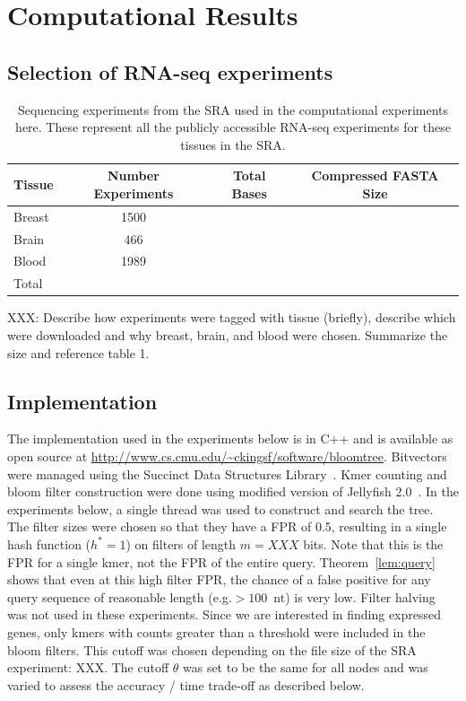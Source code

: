 \documentclass[11pt]{article}
\begin{document}

\section{Computational Results}

\subsection{Selection of RNA-seq experiments}

\begin{table}
\centering
\begin{tabular}{lccc}
\toprule
Tissue & Number Experiments & Total Bases & Compressed FASTA Size \\
\midrule
Breast & 1500 \\
Brain & 466 & \\
Blood & 1989 \\
\midrule
Total & \\
\bottomrule
\end{tabular}
\caption{Sequencing experiments from the SRA used in the computational experiments here. These represent all the publicly accessible RNA-seq experiments for these tissues in the SRA.}
\end{table}

XXX: Describe how experiments were tagged with tissue (briefly), describe which were downloaded and why breast, brain, and blood were chosen. Summarize the size and reference table 1.

\subsection{Implementation}

The implementation used in the experiments below is in C++ and is available as open source at \url{http://www.cs.cmu.edu/~ckingsf/software/bloomtree}. Bitvectors were managed using the Succinct Data Structures Library~\cite{sdsl}. Kmer counting and bloom filter construction were done using modified version of Jellyfish 2.0~\cite{jellyfish}. In the experiments below, a single thread was used to construct and search the tree. The filter sizes were chosen so that they have a FPR of $0.5$, resulting in a single hash function ($h^* = 1$) on filters of length $m=XXX$ bits. Note that this is the FPR for a single kmer, not the FPR of the entire query. Theorem~\ref{lem:query} shows that even at this high filter FPR, the chance of a false positive for any query sequence of reasonable length (e.g.\@ $> 100$~nt) is very low. Filter halving was not used in these experiments. Since we are interested in finding expressed genes, only kmers with counts greater than a threshold were included in the bloom filters. This cutoff was chosen depending on the file size of the SRA experiment: XXX. The cutoff $\theta$ was set to be the same for all nodes and was varied to assess the accuracy / time trade-off as described below. 
\end{document}
